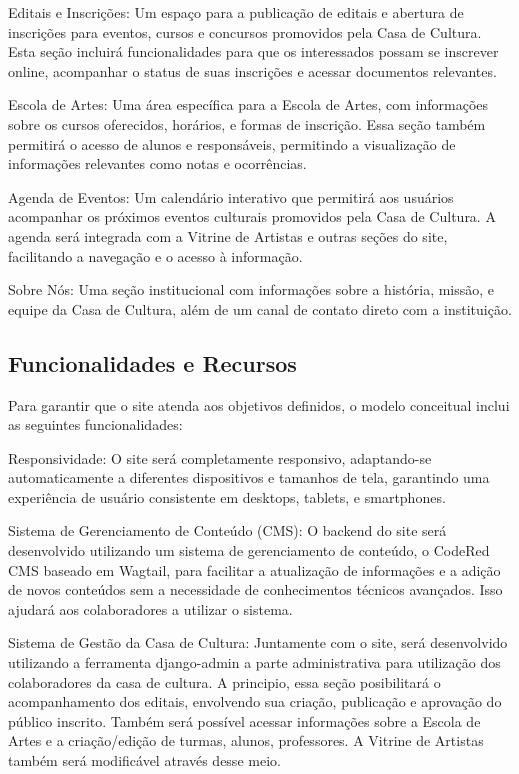 Editais e Inscrições: Um espaço para a publicação de editais e abertura de inscrições para eventos, cursos e concursos promovidos pela Casa de Cultura. Esta seção incluirá funcionalidades para que os interessados possam se inscrever online, acompanhar o status de suas inscrições e acessar documentos relevantes.

Escola de Artes: Uma área específica para a Escola de Artes, com informações sobre os cursos oferecidos, horários, e formas de inscrição. Essa seção também permitirá o acesso de alunos e responsáveis, permitindo a visualização de informações relevantes como notas e ocorrências.

Agenda de Eventos: Um calendário interativo que permitirá aos usuários acompanhar os próximos eventos culturais promovidos pela Casa de Cultura. A agenda será integrada com a Vitrine de Artistas e outras seções do site, facilitando a navegação e o acesso à informação.

Sobre Nós: Uma seção institucional com informações sobre a história, missão, e equipe da Casa de Cultura, além de um canal de contato direto com a instituição.

\subsection{Funcionalidades e Recursos}

Para garantir que o site atenda aos objetivos definidos, o modelo conceitual inclui as seguintes funcionalidades:

Responsividade: O site será completamente responsivo, adaptando-se automaticamente a diferentes dispositivos e tamanhos de tela, garantindo uma experiência de usuário consistente em desktops, tablets, e smartphones.

Sistema de Gerenciamento de Conteúdo (CMS): O backend do site será desenvolvido utilizando um sistema de gerenciamento de conteúdo, o CodeRed CMS baseado em Wagtail, para facilitar a atualização de informações e a adição de novos conteúdos sem a necessidade de conhecimentos técnicos avançados. Isso ajudará aos colaboradores a utilizar o sistema.

Sistema de Gestão da Casa de Cultura: Juntamente com o site, será desenvolvido utilizando a ferramenta django-admin a parte administrativa para utilização dos colaboradores da casa de cultura. A principio, essa seção posibilitará o acompanhamento dos editais, envolvendo sua criação, publicação e aprovação do público inscrito. Também será possível acessar informações sobre a Escola de Artes e a criação/edição de turmas, alunos, professores. A Vitrine de Artistas também será modificável através desse meio.

